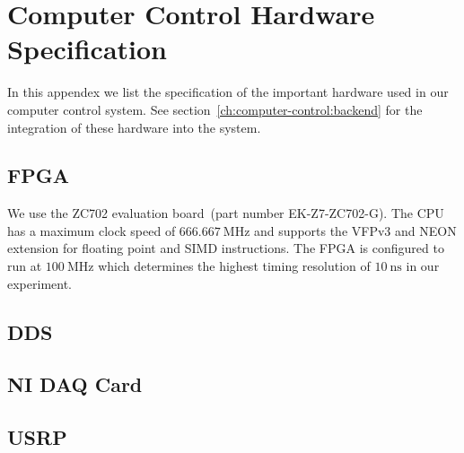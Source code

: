 
\chapter{Computer Control Hardware Specification}
\label{appendex:computer-control}

In this appendex we list the specification of the important hardware
used in our computer control system.
See section~\ref{ch:computer-control:backend} for the integration
of these hardware into the system.

\section{FPGA}
\label{appendex:computer-control:fpga}

We use the ZC702 evaluation board~(part number EK-Z7-ZC702-G).
The CPU has a maximum clock speed of $666.667~\mathrm{MHz}$
and supports the VFPv3 and NEON extension for floating point and SIMD instructions.
The FPGA is configured to run at $100~\mathrm{MHz}$ which determines
the highest timing resolution of $10~\mathrm{ns}$ in our experiment.


\section{DDS}
\label{appendex:computer-control:fpga}


\section{NI DAQ Card}


\section{USRP}

